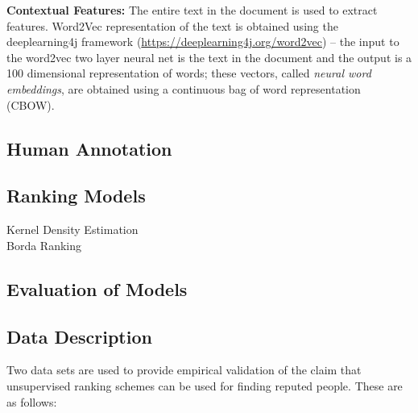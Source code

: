 \documentclass[a4paper,man,natbib]{apa6}
\begin{document}
\noindent \textbf{Contextual Features: } The entire text in the document is used to extract features. Word2Vec representation \cite{Mikolov_13} of the text is obtained using the deeplearning4j framework (\url{https://deeplearning4j.org/word2vec}) -- the input to the word2vec two layer neural net is the text in the document and the output is a 100 dimensional representation of words; these vectors, called \emph{neural word embeddings}, are obtained using a continuous bag of word representation (CBOW). 


\subsection{Human Annotation}

\subsection{Ranking Models}
 Kernel Density Estimation  \\
 Borda Ranking \\

\subsection{Evaluation of Models}


\subsection{Data Description}
Two data sets are used to provide empirical validation of the claim that unsupervised ranking schemes can be used for finding reputed people. These are as follows:
\end{document}
